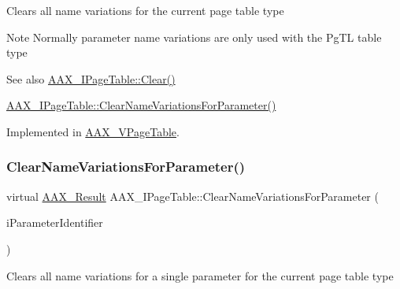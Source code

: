 Clears all name variations for the current page table type

\begin{DoxyNote}{Note}
Normally parameter name variations are only used with the {\ttfamily \textquotesingle{}Pg\+TL\textquotesingle{}} table type
\end{DoxyNote}
\begin{DoxySeeAlso}{See also}
\mbox{\hyperlink{a01849_a00a902ce17c43ae32947dba6088936d2}{A\+A\+X\+\_\+\+I\+Page\+Table\+::\+Clear()}} 

\mbox{\hyperlink{a01849_ae6cf05c366d982e8ea92fea1d98f1d22}{A\+A\+X\+\_\+\+I\+Page\+Table\+::\+Clear\+Name\+Variations\+For\+Parameter()}} 
\end{DoxySeeAlso}


Implemented in \mbox{\hyperlink{a01929_a4ec9e2d32eeb51ae589bc2e10c08a03d}{A\+A\+X\+\_\+\+V\+Page\+Table}}.

\mbox{\label{a01849_ae6cf05c366d982e8ea92fea1d98f1d22}} 
\subsubsection{\texorpdfstring{ClearNameVariationsForParameter()}{ClearNameVariationsForParameter()}}
{\footnotesize\ttfamily virtual \mbox{\hyperlink{a00392_a4d8f69a697df7f70c3a8e9b8ee130d2f}{A\+A\+X\+\_\+\+Result}} A\+A\+X\+\_\+\+I\+Page\+Table\+::\+Clear\+Name\+Variations\+For\+Parameter (\begin{DoxyParamCaption}\item[{\mbox{\hyperlink{a00392_ab4e01b971dac1b25632fd9f710dd8f77}{A\+A\+X\+\_\+\+C\+Page\+Table\+Param\+ID}}}]{i\+Parameter\+Identifier }\end{DoxyParamCaption})\hspace{0.3cm}{\ttfamily [pure virtual]}}

Clears all name variations for a single parameter for the current page table type

